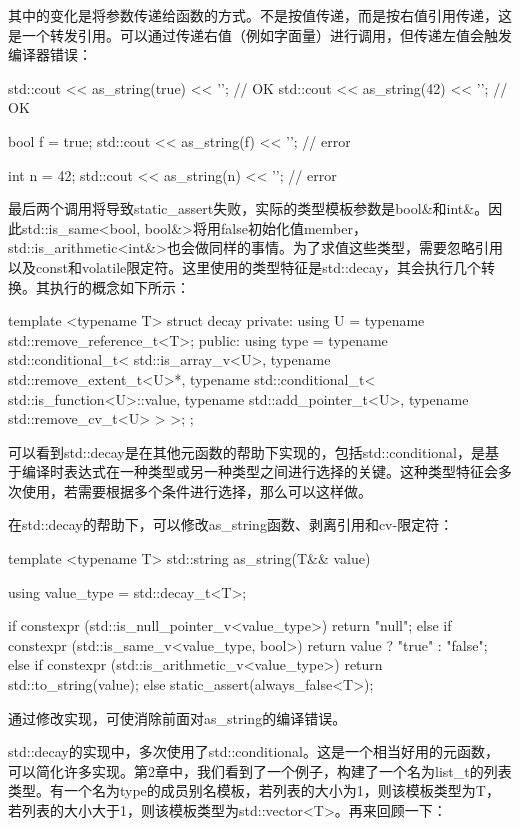 其中的变化是将参数传递给函数的方式。不是按值传递，而是按右值引用传递，这是一个转发引用。可以通过传递右值（例如字面量）进行调用，但传递左值会触发编译器错误：

\begin{cpp}
std::cout << as_string(true) << '\n'; // OK
std::cout << as_string(42) << '\n'; // OK

bool f = true;
std::cout << as_string(f) << '\n'; // error

int n = 42;
std::cout << as_string(n) << '\n'; // error
\end{cpp}

最后两个调用将导致static\_assert失败，实际的类型模板参数是bool\&和int\&。因此std::is\_same<bool, bool\&>将用false初始化值member，std::is\_arithmetic<int\&>也会做同样的事情。为了求值这些类型，需要忽略引用以及const和volatile限定符。这里使用的类型特征是std::decay，其会执行几个转换。其执行的概念如下所示：

\begin{cpp}
template <typename T>
struct decay
{
private:
	using U = typename std::remove_reference_t<T>;
public:
	using type = typename std::conditional_t<
		std::is_array_v<U>,
		typename std::remove_extent_t<U>*,
		typename std::conditional_t<
			std::is_function<U>::value,
			typename std::add_pointer_t<U>,
			typename std::remove_cv_t<U>
		>
	>;
};
\end{cpp}

可以看到std::decay是在其他元函数的帮助下实现的，包括std::conditional，是基于编译时表达式在一种类型或另一种类型之间进行选择的关键。这种类型特征会多次使用，若需要根据多个条件进行选择，那么可以这样做。

在std::decay的帮助下，可以修改as\_string函数、剥离引用和cv-限定符：

\begin{cpp}
template <typename T>
std::string as_string(T&& value)
{
	using value_type = std::decay_t<T>;

	if constexpr (std::is_null_pointer_v<value_type>)
		return "null";
	else if constexpr (std::is_same_v<value_type, bool>)
		return value ? "true" : "false";
	else if constexpr (std::is_arithmetic_v<value_type>)
		return std::to_string(value);
	else
		static_assert(always_false<T>);
}
\end{cpp}

通过修改实现，可使消除前面对as\_string的编译错误。

std::decay的实现中，多次使用了std::conditional。这是一个相当好用的元函数，可以简化许多实现。第2章中，我们看到了一个例子，构建了一个名为list\_t的列表类型。有一个名为type的成员别名模板，若列表的大小为1，则该模板类型为T，若列表的大小大于1，则该模板类型为std::vector<T>。再来回顾一下：


